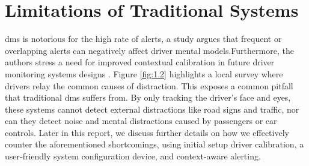 \section{Limitations of Traditional Systems}

\gls{dms} is notorious for the high rate of alerts, a study argues that frequent or overlapping alerts can negatively affect driver mental models.Furthermore, the authors stress a need for improved contextual calibration in future driver monitoring systems designs \cite{r12}. Figure \ref{fig:1.2} highlights a local survey where drivers relay the common causes of distraction. This exposes a common pitfall that traditional \gls{dms} suffers from. By only tracking the driver's face and eyes, these systems cannot detect external distractions like road signs and traffic, nor can they detect noise and mental distractions caused by passengers or car controls. Later in this report, we discuss further details on how we effectively counter the aforementioned shortcomings, using initial setup driver calibration, a user-friendly system configuration device, and context-aware alerting.

